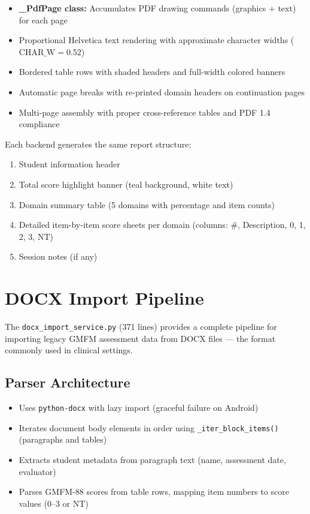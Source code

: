 \documentclass[12pt,a4paper]{article}
\begin{document}
\begin{itemize}[leftmargin=2em]
    \item \textbf{\_PdfPage class:} Accumulates PDF drawing commands (graphics + text) for each page
    \item Proportional Helvetica text rendering with approximate character widths ($\text{CHAR\_W} = 0.52$)
    \item Bordered table rows with shaded headers and full-width colored banners
    \item Automatic page breaks with re-printed domain headers on continuation pages
    \item Multi-page assembly with proper cross-reference tables and PDF 1.4 compliance
\end{itemize}

Each backend generates the same report structure:
\begin{enumerate}[leftmargin=2em]
    \item Student information header
    \item Total score highlight banner (teal background, white text)
    \item Domain summary table (5 domains with percentage and item counts)
    \item Detailed item-by-item score sheets per domain (columns: \#, Description, 0, 1, 2, 3, NT)
    \item Session notes (if any)
\end{enumerate}

\section{DOCX Import Pipeline}

The \texttt{docx\_import\_service.py} (371 lines) provides a complete pipeline for importing legacy GMFM assessment data from DOCX files — the format commonly used in clinical settings.

\subsection{Parser Architecture}

\begin{itemize}[leftmargin=2em]
    \item Uses \texttt{python-docx} with lazy import (graceful failure on Android)
    \item Iterates document body elements in order using \texttt{\_iter\_block\_items()} (paragraphs and tables)
    \item Extracts student metadata from paragraph text (name, assessment date, evaluator)
    \item Parses GMFM-88 scores from table rows, mapping item numbers to score values (0--3 or NT)
\end{itemize}
\end{document}
